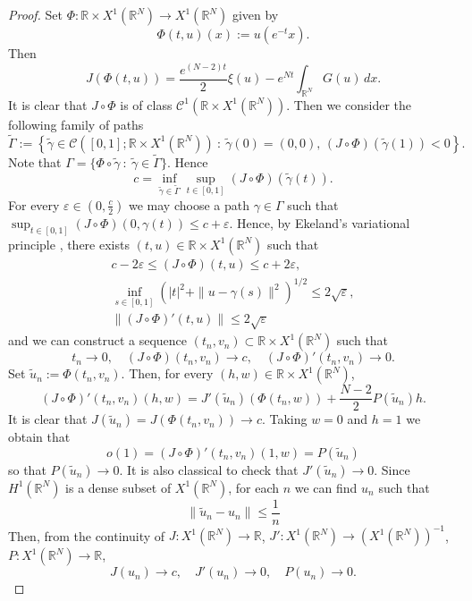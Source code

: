 \documentclass[12pt,leqno,twoside,sort]{amsart}
\newcommand{\R}{\mathbb{R}}
\newcommand{\cC}{{\mathcal C}}
\newcommand{\Ga}{\Gamma}
\numberwithin{equation}{section}
\begin{document}
\begin{proof}
Set $\Phi : \R \times X^1 (\R^N) \rightarrow X^1 (\R^N)$ given by
$$
\Phi(t, u)(x) := u(e^{-t} x).
$$
Then
$$
J(\Phi(t, u)) = \frac{e^{(N-2)t}}{2} \xi(u) - e^{Nt} \int_{\R^N} G(u) \, dx.
$$
It is clear that $J \circ \Phi$ is of class $\cC^1 (\R \times X^{1}(\R^N))$. 
Then we consider the following family of paths
$$
\widetilde{\Ga} := \left\{ \widetilde{\gamma} \in \cC ([0,1]; \R \times X^1 (\R^N)) \ : \ \widetilde{\gamma}(0)=(0,0),\, (J \circ \Phi)(\widetilde{\gamma}(1)) < 0\right\}.
$$
Note that $\Ga = \{ \Phi \circ \widetilde{\gamma} \ : \ \widetilde{\gamma} \in \widetilde{\Ga} \}$. Hence
$$
c = \inf_{\widetilde{\gamma} \in \widetilde{\Ga}} \sup_{t \in [0,1]} (J \circ \Phi)(\widetilde{\gamma}(t)).
$$
For every $\varepsilon \in \left(0, \frac{c}{2} \right)$ we may choose a path $\gamma \in \Ga$ such that $\sup_{t \in [0,1]} (J \circ \Phi)(0,\gamma(t)) \leq c + \varepsilon$. Hence, by Ekeland's variational principle \cite[Theorem 2.8]{W}, there exists $(t, u) \in \R \times X^1 (\R^N)$ such that
\begin{align*}
c - 2\varepsilon \leq (J \circ \Phi)(t,u) \leq c + 2\varepsilon, \\
\inf_{s \in [0,1]} \left( |t|^2 + \| u - \gamma(s) \|^2 \right)^{1/2} \leq 2 \sqrt{\varepsilon}, \\
\left\| (J \circ \Phi)' (t,u) \right\| \leq 2 \sqrt{\varepsilon}
\end{align*}
and we can construct a sequence $(t_n, v_n) \subset \R \times X^1 (\R^N)$ such that
$$
t_n \to 0, \quad (J \circ \Phi)(t_n, v_n) \to c, \quad (J \circ \Phi)'(t_n, v_n) \to 0.
$$
Set $\widetilde{u}_n := \Phi(t_n, v_n)$. Then, for every $(h, w) \in \R \times X^1 (\R^N)$,
$$
(J \circ \Phi)'(t_n, v_n) (h,w) = J'(\widetilde{u}_n)(\Phi(t_n,w)) + \frac{N-2}{2} P(\widetilde{u}_n)h. 
$$
It is clear that $J(\widetilde{u}_n) = J(\Phi(t_n, v_n)) \to c$. Taking $w = 0$ and $h=1$ we obtain that
$$
o(1) = (J \circ \Phi)'(t_n, v_n) (1, w) = P(\widetilde{u}_n)
$$
so that $P(\widetilde{u}_n) \to 0$. It is also classical to check that $J'(\widetilde{u}_n) \to 0$. Since $H^1(\R^N)$ is a dense subset of $X^1(\R^N)$, for each $n$ we can find $u_n$ such that
\[
\|\widetilde{u}_n-u_n\| \leq \frac 1n
\]
Then, from the continuity of $J : X^1(\R^N) \rightarrow \R$, $J' : X^1 (\R^N) \rightarrow (X^1(\R^N))^{-1}$, $P : X^1(\R^N) \rightarrow \R$, 
$$
J(u_n) \to c, \quad J'(u_n) \to 0, \quad P(u_n) \to 0.
$$
\end{proof}
\end{document}
